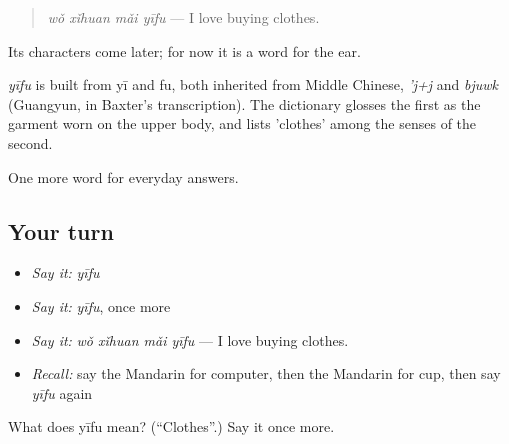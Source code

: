 \begin{quote}
\emph{wǒ xǐhuan mǎi yīfu} — I love buying clothes.
\end{quote}

Its characters come later; for now it is a word for the ear.

\begin{cousinweb}
\emph{yīfu} is built from yī and fu, both inherited from Middle Chinese, \emph{'j+j} and \emph{bjuwk} (Guangyun, in Baxter's transcription). The dictionary glosses the first as the garment worn on the upper body, and lists 'clothes' among the senses of the second.
\end{cousinweb}

\begin{grammarlens}[title={What you've built}]
One more word for everyday answers.
\end{grammarlens}

\subsection*{Your turn}
\begin{itemize}
\raggedright
  \item \emph{Say it:} \emph{yīfu}
  \item \emph{Say it:} \emph{yīfu}, once more
  \item \emph{Say it:} \emph{wǒ xǐhuan mǎi yīfu} — I love buying clothes.
  \item \emph{Recall:} say the Mandarin for computer, then the Mandarin for cup, then say \emph{yīfu} again
\end{itemize}

\begin{tcolorbox}[breakable,colback=teal!4,colframe=teal!35!black,title={Before you move on}]
What does yīfu mean? (\textquotedblleft{}Clothes\textquotedblright{}.) Say it once more.
\end{tcolorbox}

